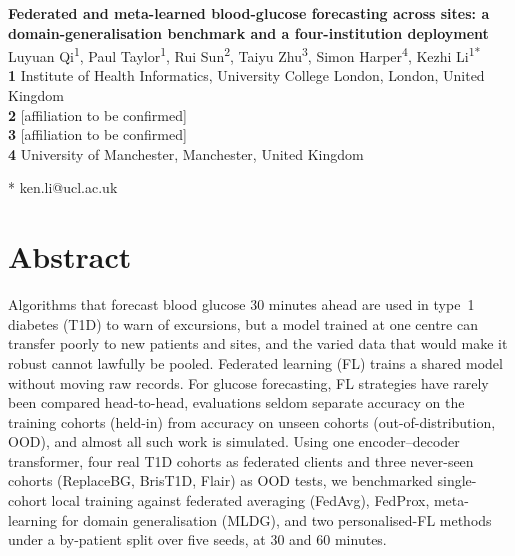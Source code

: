 \documentclass[10pt,letterpaper]{article}
\begin{document}
\vspace*{0.2in}

\begin{flushleft}
{\Large
\textbf{Federated and meta-learned blood-glucose forecasting across sites: a domain-generalisation benchmark and a four-institution deployment}
}
\newline
\\
Luyuan Qi\textsuperscript{1},
Paul Taylor\textsuperscript{1},
Rui Sun\textsuperscript{2},
Taiyu Zhu\textsuperscript{3},
Simon Harper\textsuperscript{4},
Kezhi Li\textsuperscript{1*}
\\
\bigskip
\textbf{1} Institute of Health Informatics, University College London, London, United Kingdom
\\
\textbf{2} [affiliation to be confirmed]
\\
\textbf{3} [affiliation to be confirmed]
\\
\textbf{4} University of Manchester, Manchester, United Kingdom
\\
\bigskip

* ken.li@ucl.ac.uk

\end{flushleft}

\section*{Abstract}
Algorithms that forecast blood glucose 30 minutes ahead are used in type~1
diabetes (T1D) to warn of excursions, but a model trained at one centre can
transfer poorly to new patients and sites, and the varied data that would
make it robust cannot lawfully be pooled. Federated learning (FL)
trains a shared model without moving raw records. For glucose forecasting, FL
strategies have rarely been compared head-to-head, evaluations seldom
separate accuracy on the training cohorts (held-in) from accuracy on unseen
cohorts (out-of-distribution, OOD), and almost all such work is simulated.
Using one encoder--decoder transformer, four real T1D cohorts as federated
clients and three never-seen cohorts (ReplaceBG, BrisT1D, Flair) as OOD
tests, we benchmarked single-cohort local training against federated
averaging (FedAvg), FedProx, meta-learning for domain generalisation (MLDG),
and two personalised-FL methods under a by-patient split over five seeds, at
30 and 60 minutes.
\end{document}
